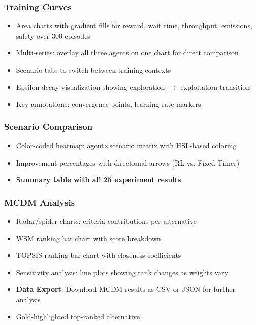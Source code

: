 \documentclass[12pt, a4paper]{article}
\begin{document}
\subsubsection{Training Curves}
\begin{itemize}[nosep]
    \item Area charts with gradient fills for reward, wait time, throughput, emissions, safety over 300 episodes
    \item Multi-series: overlay all three agents on one chart for direct comparison
    \item Scenario tabs to switch between training contexts
    \item Epsilon decay visualization showing exploration $\rightarrow$ exploitation transition
    \item Key annotations: convergence points, learning rate markers
\end{itemize}

\subsubsection{Scenario Comparison}
\begin{itemize}[nosep]
    \item Color-coded heatmap: agent$\times$scenario matrix with HSL-based coloring
    \item Improvement percentages with directional arrows (RL vs. Fixed Timer)
    \item \textbf{Summary table with all 25 experiment results}
\end{itemize}

\subsubsection{MCDM Analysis}
\begin{itemize}[nosep]
    \item Radar/spider charts: criteria contributions per alternative
    \item WSM ranking bar chart with score breakdown
    \item TOPSIS ranking bar chart with closeness coefficients
    \item Sensitivity analysis: line plots showing rank changes as weights vary
    \item \textbf{Data Export}: Download MCDM results as CSV or JSON for further analysis
    \item Gold-highlighted top-ranked alternative
\end{itemize}
\end{document}
